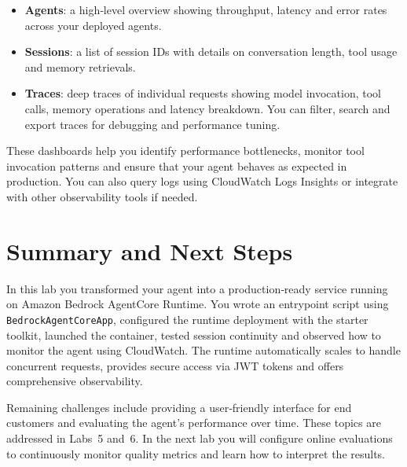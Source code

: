 \begin{itemize}
  \item \textbf{Agents}: a high‑level overview showing throughput,
        latency and error rates across your deployed agents.
  \item \textbf{Sessions}: a list of session IDs with details on
        conversation length, tool usage and memory retrievals.
  \item \textbf{Traces}: deep traces of individual requests showing
        model invocation, tool calls, memory operations and latency
        breakdown.  You can filter, search and export traces for
        debugging and performance tuning.
\end{itemize}

These dashboards help you identify performance bottlenecks, monitor
tool invocation patterns and ensure that your agent behaves as
expected in production.  You can also query logs using CloudWatch
Logs Insights or integrate with other observability tools if needed.

\section{Summary and Next Steps}

In this lab you transformed your agent into a production‑ready service
running on Amazon Bedrock AgentCore Runtime.  You wrote an entrypoint
script using \texttt{BedrockAgentCoreApp}, configured the runtime
deployment with the starter toolkit, launched the container, tested
session continuity and observed how to monitor the agent using
CloudWatch.  The runtime automatically scales to handle concurrent
requests, provides secure access via JWT tokens and offers
comprehensive observability.

Remaining challenges include providing a user‑friendly interface for
end customers and evaluating the agent’s performance over time.
These topics are addressed in Labs 5 and 6.  In the next lab you will
configure online evaluations to continuously monitor quality metrics
and learn how to interpret the results.

